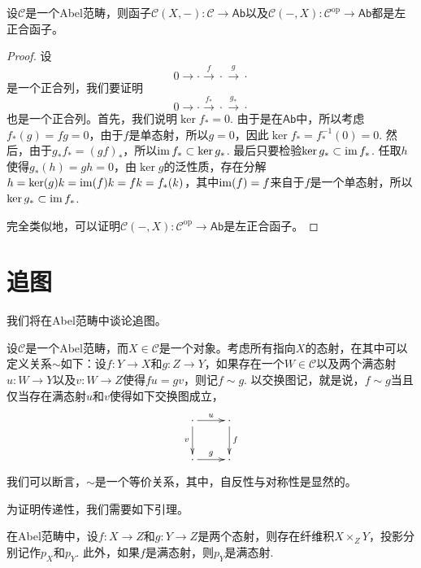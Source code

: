 \begin{pro}
设$\mathcal{C}$是一个Abel范畴，则函子$\mathcal{C}(X,-):\mathcal{C}\to \mathsf{Ab}$以及$\mathcal{C}(-,X):\mathcal{C}^\mathrm{op} \to \mathsf{Ab}$都是左正合函子。
\end{pro}

\begin{proof}
	设
	\[
		0\to\cdot \xrightarrow{f}\cdot \xrightarrow{g}\cdot
	\]
	是一个正合列，我们要证明
	\[
	0\to \cdot \xrightarrow{f_*}\cdot \xrightarrow{g_*}\cdot
	\]
	也是一个正合列。首先，我们说明$\ker f_*=0$. 由于是在$\mathsf{Ab}$中，所以考虑$f_*(g)=fg=0$，由于$f$是单态射，所以$g=0$，因此$\ker f_*=f_*^{-1}(0)=0$. 然后，由于$g_*f_*=(gf)_*$，所以$\operatorname{im} f_*\subset \ker g_*$. 最后只要检验$\ker g_*\subset \operatorname{im} f_*$. 任取$h$使得$g_*(h)=gh=0$，由$\ker g$的泛性质，存在分解$h=\ker(g)k=\operatorname{im}(f)k=fk=f_*(k)$，其中$\operatorname{im}(f)=f$来自于$f$是一个单态射，所以$\ker g_* \subset \operatorname{im} f_*$.

	完全类似地，可以证明$\mathcal{C}(-,X):\mathcal{C}^\text{op} \to \mathsf{Ab}$是左正合函子。
\end{proof}

\section{追图}

我们将在Abel范畴中谈论追图。

\begin{lem}\label{zhuitu}
设$\mathcal{C}$是一个Abel范畴，而$X\in \mathcal{C}$是一个对象。考虑所有指向$X$的态射，在其中可以定义关系$\sim$如下：设$f:Y\to X$和$g:Z\to Y$，如果存在一个$W\in \mathcal{C}$以及两个满态射$u:W\to Y$以及$v:W\to Z$使得$fu=gv$，则记$f\sim g$. 以交换图记，就是说，$f\sim g$当且仅当存在满态射$u$和$v$使得如下交换图成立，
\[
\xymatrix{
	\cdot \ar[r]^u \ar[d]_v & \cdot\ar[d]^f\\
	\cdot \ar[r]^g & \cdot
}
\]
我们可以断言，$\sim$是一个等价关系，其中，自反性与对称性是显然的。
\end{lem}

为证明传递性，我们需要如下引理。

\begin{lem}\label{mt}
	在Abel范畴中，设$f:X\to Z$和$g:Y\to Z$是两个态射，则存在纤维积$X\times_Z Y$，投影分别记作$p_X$和$p_Y$. 此外，如果$f$是满态射，则$p_Y$是满态射.
\end{lem}

